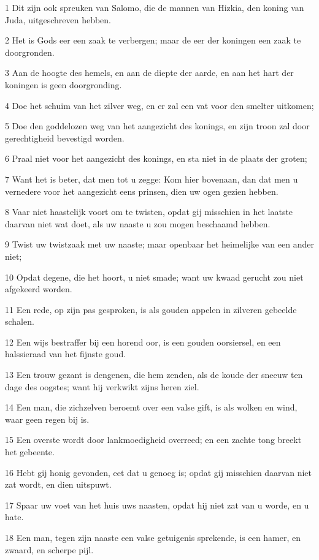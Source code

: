 \par 1 Dit zijn ook spreuken van Salomo, die de mannen van Hizkia, den koning van Juda, uitgeschreven hebben.
\par 2 Het is Gods eer een zaak te verbergen; maar de eer der koningen een zaak te doorgronden.
\par 3 Aan de hoogte des hemels, en aan de diepte der aarde, en aan het hart der koningen is geen doorgronding.
\par 4 Doe het schuim van het zilver weg, en er zal een vat voor den smelter uitkomen;
\par 5 Doe den goddelozen weg van het aangezicht des konings, en zijn troon zal door gerechtigheid bevestigd worden.
\par 6 Praal niet voor het aangezicht des konings, en sta niet in de plaats der groten;
\par 7 Want het is beter, dat men tot u zegge: Kom hier bovenaan, dan dat men u vernedere voor het aangezicht eens prinsen, dien uw ogen gezien hebben.
\par 8 Vaar niet haastelijk voort om te twisten, opdat gij misschien in het laatste daarvan niet wat doet, als uw naaste u zou mogen beschaamd hebben.
\par 9 Twist uw twistzaak met uw naaste; maar openbaar het heimelijke van een ander niet;
\par 10 Opdat degene, die het hoort, u niet smade; want uw kwaad gerucht zou niet afgekeerd worden.
\par 11 Een rede, op zijn pas gesproken, is als gouden appelen in zilveren gebeelde schalen.
\par 12 Een wijs bestraffer bij een horend oor, is een gouden oorsiersel, en een halssieraad van het fijnste goud.
\par 13 Een trouw gezant is dengenen, die hem zenden, als de koude der sneeuw ten dage des oogstes; want hij verkwikt zijns heren ziel.
\par 14 Een man, die zichzelven beroemt over een valse gift, is als wolken en wind, waar geen regen bij is.
\par 15 Een overste wordt door lankmoedigheid overreed; en een zachte tong breekt het gebeente.
\par 16 Hebt gij honig gevonden, eet dat u genoeg is; opdat gij misschien daarvan niet zat wordt, en dien uitspuwt.
\par 17 Spaar uw voet van het huis uws naasten, opdat hij niet zat van u worde, en u hate.
\par 18 Een man, tegen zijn naaste een valse getuigenis sprekende, is een hamer, en zwaard, en scherpe pijl.
